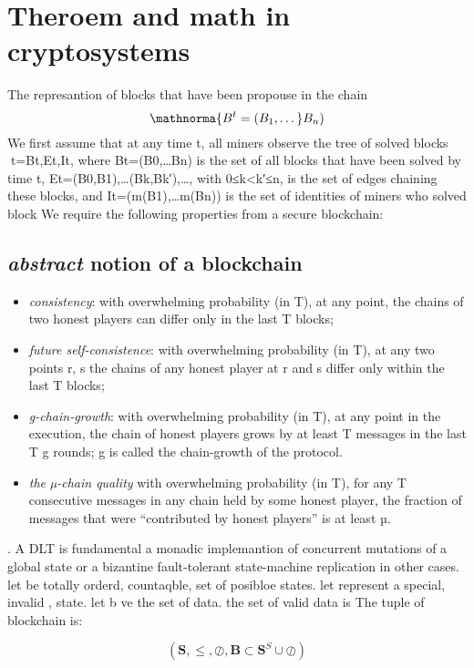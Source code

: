 \documentclass{article}
\begin{document}
\section{Theroem and math in cryptosystems}
The represantion of blocks that have been propouse in the chain
\begin{equation}
 \mathnorma{B^t= (B_1, \dotso }B_n)
 \end{equation}
We first assume that at any time t⁠, all miners observe the tree of solved blocks t={Bt,Et,It}⁠, where Bt=(B0,…Bn) is the set of all blocks that have been solved by time t⁠, Et={(B0,B1),…(Bk,Bk′),…}⁠, with 0≤k<k′≤n⁠, is the set of edges chaining these blocks, and It=(m(B1),…m(Bn)) is the set of identities of miners who solved block
We require the following properties from a secure blockchain:
\subsection{\textit{abstract} notion of a blockchain}
\begin{itemize}
\item \textit{consistency}: with overwhelming probability (in T), at any point, the chains of two honest
players can differ only in the last T blocks;
\item \textit{future self-consistence}: with overwhelming probability (in T), at any two points r, s the chains
of any honest player at r and s differ only within the last T blocks;
\item \textit{g-chain-growth}: with overwhelming probability (in T), at any point in the execution, the
chain of honest players grows by at least T messages in the last T
g
rounds; g is called the
chain-growth of the protocol.
\item \textit{the µ-chain quality}  with overwhelming probability (in T), for any T consecutive messages in
any chain held by some honest player, the fraction of messages that were “contributed by
honest players” is at least µ.
\end{itemize}
\cite{asyncronusblockch}.
A DLT is fundamental a monadic implemantion of concurrent mutations of a global state or a bizantine fault-tolerant state-machine replication in other cases.
let  be totally orderd, countaqble, set of posibloe states.
let represent a special, invalid , state.
let b ve the set of data. the set of valid data is  
The tuple of blockchain is:


\begin{equation}
( \mathbf{S} , \leq, \oslash, \mathbf{B} \subset \mathbf{S}^S∪\oslash)


\end{equation}
\end{document}
